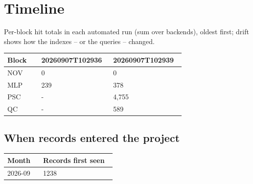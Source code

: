 \documentclass[10pt,a4paper]{article}
\begin{document}
\section*{Timeline}
Per-block hit totals in each automated run (sum over backends), oldest first; drift shows how the indexes -- or the queries -- changed.

{\scriptsize\begin{longtable}{p{0.180\linewidth}p{0.381\linewidth}p{0.381\linewidth}}
\hline
\textbf{Block} & \textbf{20260907T102936} & \textbf{20260907T102939} \\ \hline
\endhead
NOV & 0 & 0 \\
MLP & 239 & 378 \\
PSC & - & 4,755 \\
QC & - & 589 \\
\hline
\end{longtable}}
\subsection*{When records entered the project}
{\scriptsize\begin{longtable}{p{0.318\linewidth}p{0.637\linewidth}}
\hline
\textbf{Month} & \textbf{Records first seen} \\ \hline
\endhead
2026-09 & 1238 \\
\hline
\end{longtable}}
\end{document}
